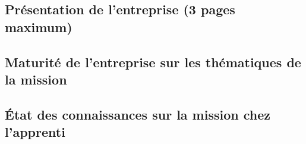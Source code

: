 \documentclass[a4paper, 12pt]{article}
\begin{document}

%     


\subsection{Présentation de l'entreprise (3 pages maximum)}

    
    \newpage{}


\subsection{Maturité de l’entreprise sur les thématiques de la mission}


    
    \newpage{}


\subsection{État des connaissances sur la mission chez l’apprenti}

\end{document}
